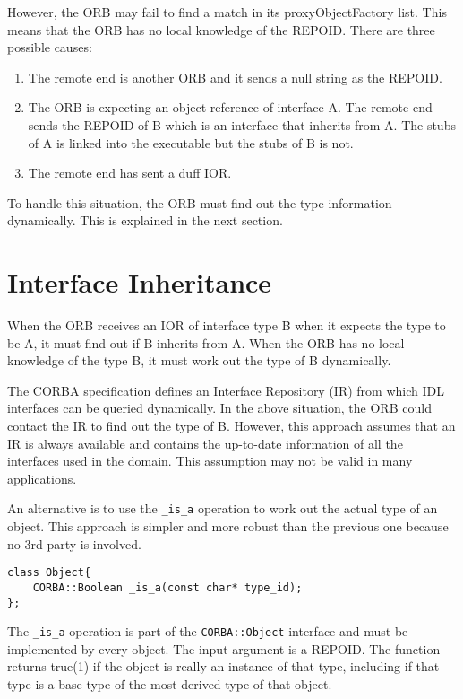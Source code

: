 \documentclass[11pt,twoside,onecolumn]{book}
\begin{document}
However, the ORB may fail to find a match in its proxyObjectFactory
list. This means that the ORB has no local knowledge of the REPOID.
There are three possible causes:

\begin{enumerate}
\item The remote end is another ORB and it sends a null string as the REPOID.
\item The ORB is expecting an object reference of interface A. The remote
      end sends the REPOID of B which is an interface that inherits from A.
      The stubs of A is linked into the executable but the stubs of B is
      not.
\item The remote end has sent a duff IOR.
\end{enumerate}

To handle this situation, the ORB must find out the type information
dynamically. This is explained in the next section.

\section{Interface Inheritance}

When the ORB receives an IOR of interface type B when it expects the type to
be A, it must find out if B inherits from A. When the ORB has no local
knowledge of the type B, it must work out the type of B dynamically.

The CORBA specification defines an Interface Repository (IR) from which IDL
interfaces can be queried dynamically. In the above situation, the ORB
could contact the IR to find out the type of B. However, this approach
assumes that an IR is always available and contains the up-to-date
information of all the interfaces used in the domain. This assumption may
not be valid in many applications.

An alternative is to use the {\tt \_is\_a} operation to
work out the actual type of an object. This approach is simpler
and more robust than the previous one because no 3rd party is involved. 

{\small
\begin{verbatim}
class Object{
    CORBA::Boolean _is_a(const char* type_id);
};
\end{verbatim}
}

The {\tt \_is\_a} operation is part of the {\tt CORBA::Object} interface
and must be implemented by every object. The input argument is a
REPOID. The function returns true(1) if the object is really an instance of
that type, including if that type is a base type of the most derived type
of that object.
\end{document}
